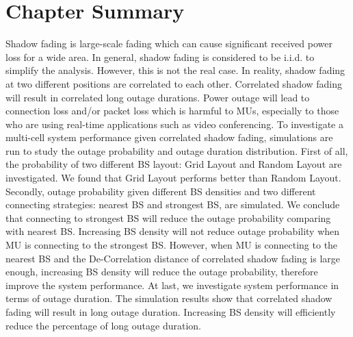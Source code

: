 \section{Chapter Summary}
\label{ch4:Conclusion}
Shadow fading is large-scale fading which can cause significant received power loss for a wide area. In general, shadow fading is considered to be i.i.d. to simplify the analysis. However, this is not the real case. In reality, shadow fading at two different positions are correlated to each other. Correlated shadow fading will result in correlated long outage durations. Power outage will lead to connection loss and/or packet loss which is harmful to MUs, especially to those who are using real-time applications such as video conferencing. To investigate a multi-cell system performance given correlated shadow fading, simulations are run to study the outage probability and outage duration distribution. First of all, the probability of two different BS layout: Grid Layout and Random Layout are investigated. We found that Grid Layout performs better than Random Layout. Secondly, outage probability given different BS densities and two different connecting strategies: nearest BS and strongest BS, are simulated. We conclude that connecting to strongest BS will reduce the outage probability comparing with nearest BS. Increasing BS density will not reduce outage probability when MU is connecting to the strongest BS. However, when MU is connecting to the nearest BS and the De-Correlation distance of correlated shadow fading is large enough, increasing BS density will reduce the outage probability, therefore improve the system performance. At last, we investigate system performance in terms of outage duration. The simulation results show that correlated shadow fading will result in long outage duration. Increasing BS density will efficiently reduce the percentage of long outage duration.
 

